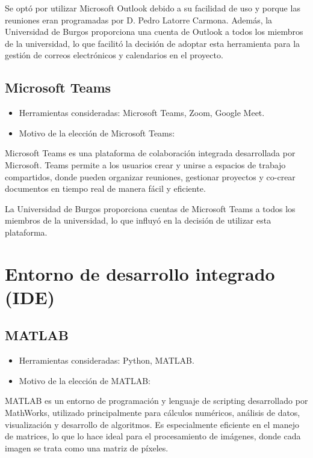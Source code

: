 Se optó por utilizar Microsoft Outlook debido a su facilidad de uso y porque las reuniones eran programadas por D. Pedro Latorre Carmona. Además, la Universidad de Burgos proporciona una cuenta de Outlook a todos los miembros de la universidad, lo que facilitó la decisión de adoptar esta herramienta para la gestión de correos electrónicos y calendarios en el proyecto.

\subsection{Microsoft Teams}\label{microsoft-teams}

\begin{itemize}
    \item Herramientas consideradas: Microsoft Teams, Zoom, Google Meet.
    \item Motivo de la elección de Microsoft Teams:
\end{itemize}

Microsoft Teams es una plataforma de colaboración integrada desarrollada por Microsoft. Teams permite a los usuarios crear y unirse a espacios de trabajo compartidos, donde pueden organizar reuniones, gestionar proyectos y co-crear documentos en tiempo real de manera fácil y eficiente.

La Universidad de Burgos proporciona cuentas de Microsoft Teams a todos los miembros de la universidad, lo que influyó en la decisión de utilizar esta plataforma.

\section{Entorno de desarrollo integrado (IDE)}\label{ide}

\subsection{MATLAB}\label{matlab}

\begin{itemize}
    \item Herramientas consideradas: Python, MATLAB.
    \item Motivo de la elección de MATLAB:
\end{itemize}

MATLAB es un entorno de programación y lenguaje de scripting desarrollado por MathWorks, utilizado principalmente para cálculos numéricos, análisis de datos, visualización y desarrollo de algoritmos. Es especialmente eficiente en el manejo de matrices, lo que lo hace ideal para el procesamiento de imágenes, donde cada imagen se trata como una matriz de píxeles.

